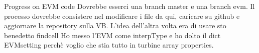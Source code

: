 Progress on EVM code
Dovrebbe esserci una branch master e una branch evm. 
Il processo dovrebbe consistere nel modificare i file da qui, caricare su github e 
aggiornare la repository sulla VB. L'idea dell'altra volta era di usare sto benedetto findcell
Ho messo l'EVM come interpType e ho dolto il dict EVMsetting perchè voglio che stia
tutto in turbine array properties.  